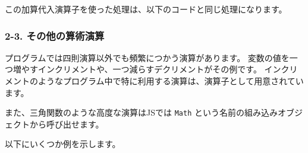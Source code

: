 この加算代入演算子を使った処理は、以下のコードと同じ処理になります。

\begin{Shaded}
\begin{Highlighting}[]
\OperatorTok{=} \OperatorTok{;}
\OperatorTok{=}\OperatorTok{+} \OperatorTok{;}
\end{Highlighting}
\end{Shaded}

\subsubsection{2-3.
その他の算術演算}\label{ux305dux306eux4ed6ux306eux7b97ux8853ux6f14ux7b97}

プログラムでは四則演算以外でも頻繁につかう演算があります。
変数の値を一つ増やすインクリメントや、一つ減らすデクリメントがその例です。
インクリメントのようなプログラム中で特に利用する演算は、演算子として用意されています。

また、三角関数のような高度な演算はJSでは \texttt{Math}
という名前の組み込みオブジェクトから呼び出せます。

以下にいくつか例を示します。

